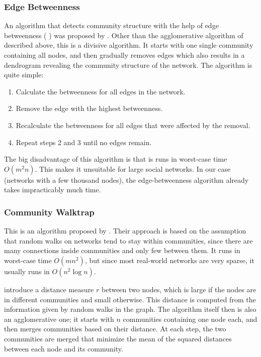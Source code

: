 \subsubsection{Edge Betweenness}
\label{ssst:edgebetweenness} An algorithm that detects community structure with the help of edge betweenness (%
) was proposed by \cite{Girvan_2002}. Other than the agglomerative algorithm of \cite{Clauset_2004} described above, this is a divisive algorithm. It starts with one single community containing all nodes, and then gradually removes edges which also results in a dendrogram revealing the community structure of the network. The algorithm is quite simple:

\begin{enumerate}
\item Calculate the betweenness for all edges in the network.
\item Remove the edge with the highest betweenness.
\item Recalculate the betweenness for all edges that were affected by the removal.
\item Repeat steps 2 and 3 until no edges remain.
\end{enumerate}

The big disadvantage of this algorithm is that is runs in worst-case time $O(m^2n)$. This makes it unsuitable for large social networks. In our case (networks with a few thousand nodes), the edge-betweenness algorithm already takes impracticably much time.

\subsubsection{Community Walktrap}
\label{ssst:communitywalktrap} This is an algorithm proposed by \cite{Pons_2005}. Their approach is based on the assumption that random walks on networks tend to stay within communities, since there are many connections inside communities and only few between them. It runs in worst-case time $O(m n^2)$, but since most real-world networks are very sparse, it usually runs in $O(n^2\log n)$.

\cite{Pons_2005} introduce a distance measure $r$ between two nodes, which is large if the nodes are in different communities and small otherwise. This distance is computed from the information given by random walks in the graph. The algorithm itself then is also an agglomerative one; it starts with $n$ communities containing one node each, and then merges communities based on their distance. At each step, the two communities are merged that minimize the mean of the squared distances between each node and its community.

